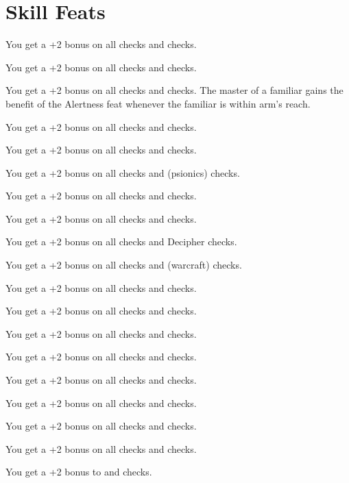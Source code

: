 \section{Skill Feats}

{You get a +2 bonus on all  checks and  checks.}

{You get a +2 bonus on all  checks and  checks.}

{You get a +2 bonus on all  checks and  checks.}
{}
{The master of a familiar gains the benefit of the Alertness feat whenever the familiar is within arm’s reach.}

{You get a +2 bonus on all  checks and  checks.}

{You get a +2 bonus on all  checks and  checks.}

{You get a +2 bonus on all  checks and  (psionics) checks.}

{You get a +2 bonus on all  checks and  checks.}

{You get a +2 bonus on all  checks and  checks.}

{You get a +2 bonus on all  checks and Decipher  checks.}

{You get a +2 bonus on all  checks and  (warcraft) checks.}

{You get a +2 bonus on all  checks and  checks.}

{You get a +2 bonus on all  checks and  checks.}

{You get a +2 bonus on all  checks and  checks.}

{You get a +2 bonus on all  checks and  checks.}

{You get a +2 bonus on all  checks and  checks.}

{You get a +2 bonus on all  checks and  checks.}

{You get a +2 bonus on all  checks and  checks.}

{You get a +2 bonus on all  checks and  checks.}

{You get a +2 bonus to  and  checks.}